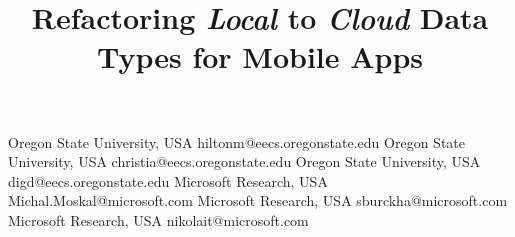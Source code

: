 \documentclass[article]{sigplanconf}
\begin{document}
\thispagestyle{empty}


\setlength{\pdfpageheight}{\paperheight}
\setlength{\pdfpagewidth}{\paperwidth}


\doi{}





\title{Refactoring \emph{Local} to \emph{Cloud} Data Types for Mobile Apps}

           {Oregon State University, USA}
           {hiltonm@eecs.oregonstate.edu}
           {Oregon State University, USA}
           {christia@eecs.oregonstate.edu}
           {Oregon State University, USA}
           {digd@eecs.oregonstate.edu}
           {Microsoft Research, USA}
           {Michal.Moskal@microsoft.com}
           {Microsoft Research, USA}
           {sburckha@microsoft.com}
           {Microsoft Research, USA}
           {nikolait@microsoft.com}
\maketitle
\end{document}
